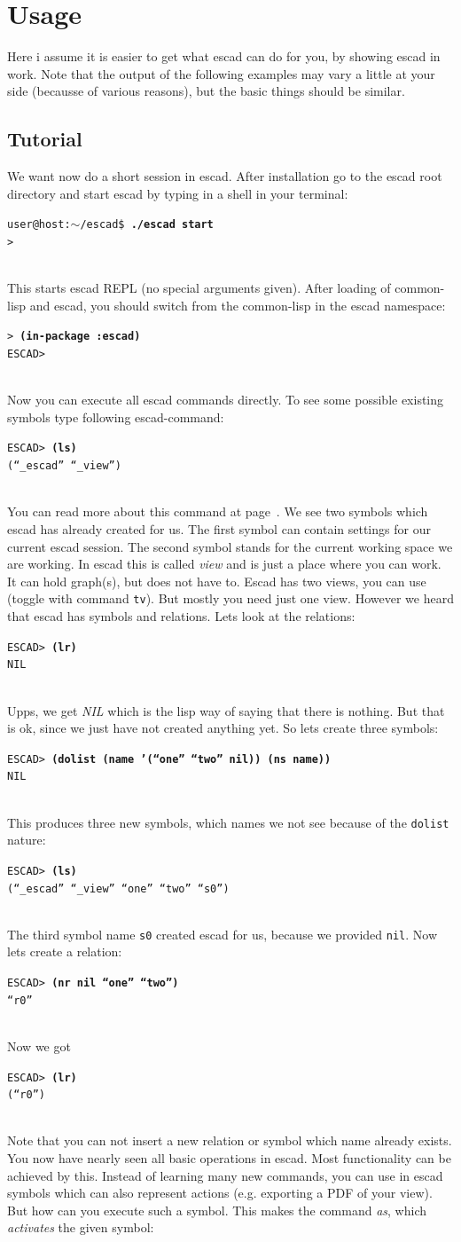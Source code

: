 \documentclass[a4paper, 12pt, openany]{scrbook}
\makeatletter
\newcommand{\shellcmdline}[2]{\\
  \setlength{\fboxsep}{2pt}\colorbox{black!20}{\parbox{\textwidth}{\texttt{user@host:$\sim$/escad\$ \textbf{#1}\\#2}}}\\}
\newcommand{\escadcmdline}[2]{\\\setlength{\fboxsep}{2pt}\colorbox{black!20}{\parbox{\textwidth}{\texttt{ESCAD> \textbf{#1}\\#2}}}\\}
\newcommand{\lispcmdline}[2]{\\\setlength{\fboxsep}{2pt}\colorbox{black!20}{\parbox{\textwidth}{\texttt{> \textbf{#1}\\#2}}}\\}
\makeatother
\begin{document}
\chapter{Usage}
Here i assume it is easier to get what escad can do for you, by showing escad in work. Note that the output of the following examples may vary a little at your side (becausse of various reasons), but the basic things should be similar.
\section{Tutorial}
We want now do a short session in escad. After installation go to the escad root directory and start escad by typing in a shell in your terminal:
\shellcmdline{./escad start}{>}
This starts escad REPL (no special arguments given). After loading of common-lisp and escad, you should switch from the common-lisp in the escad namespace:
\lispcmdline{(in-package :escad)}{ESCAD>}
Now you can execute all escad commands directly. To see some possible existing symbols type following escad-command:
\escadcmdline{(ls)}{(``\_escad'' ``\_view'')}\label{ex:ls}
You can read more about this command at page~\pageref{it:ls}. We see two symbols which escad has already created for us. The first symbol can contain settings for our current escad session. The second symbol stands for the current working space we are working. In escad this is called \emph{view} and is just a place where you can work. It can hold graph(s), but does not have to. Escad has two views, you can use (toggle with command \texttt{tv}). But mostly you need just one view.
However we heard that escad has symbols and relations. Lets look at the relations:
\escadcmdline{(lr)}{NIL}\label{ex:lr}
Upps, we get \emph{NIL} which is the lisp way of saying that there is nothing. But that is ok, since we just have not created anything yet. So lets create three symbols:
\escadcmdline{(dolist (name '(``one'' ``two'' nil)) (ns name))}{NIL}\label{ex:ns}
This produces three new symbols, which names we not see because of the \texttt{dolist} nature:
\escadcmdline{(ls)}{(``\_escad'' ``\_view'' ``one'' ``two'' ``s0'')}
The third symbol name \texttt{s0} created escad for us, because we provided \texttt{nil}.
Now lets create a relation:
\escadcmdline{(nr nil ``one'' ``two'')}{``r0''}\label{ex:nr}
Now we got
\escadcmdline{(lr)}{(``r0'')}
Note that you can not insert a new relation or symbol which name already exists.
You now have nearly seen all basic operations in escad. Most functionality can be achieved by this. Instead of learning many new commands, you can use in escad symbols which can also represent actions (e.g. exporting a PDF of your view). But how can you execute such a symbol. This makes the command \emph{as}, which \emph{activates} the given symbol:
\end{document}
